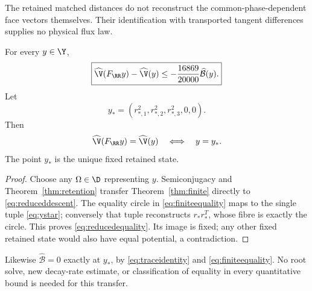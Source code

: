 The retained matched distances do not reconstruct the common-phase-dependent face vectors themselves. Their identification with transported tangent differences supplies no physical flux law.

\begin{corollary}\label{cor:retaineddescent}
For every \(y\in\Y\),
\begin{equation}
\boxed{\widehat{\V}(F_{\RR}y)-\widehat{\V}(y)
\le-\frac{16869}{20000}\widehat{\mathcal B}(y).}
\label{eq:reduceddescent}
\end{equation}
Let
\begin{equation}
y_*=(r_{*,1}^2,r_{*,2}^2,r_{*,3}^2,0,0).
\label{eq:ystar}
\end{equation}
Then
\begin{equation}
\widehat{\V}(F_{\RR}y)=\widehat{\V}(y)
\quad\Longleftrightarrow\quad y=y_*.
\label{eq:reducedequality}
\end{equation}
The point \(y_*\) is the unique fixed retained state.
\end{corollary}
\begin{proof}
Choose any \(\Omega\in\D\) representing \(y\). Semiconjugacy and Theorem~\ref{thm:retention} transfer Theorem~\ref{thm:finite} directly to \eqref{eq:reduceddescent}. The equality circle in \eqref{eq:finiteequality} maps to the single tuple \eqref{eq:ystar}; conversely that tuple reconstructs \(r_*r_*^T\), whose fibre is exactly the circle. This proves \eqref{eq:reducedequality}. Its image is fixed; any other fixed retained state would also have equal potential, a contradiction.
\end{proof}

Likewise \(\widehat{\mathcal B}=0\) exactly at \(y_*\), by \eqref{eq:traceidentity} and \eqref{eq:finiteequality}. No root solve, new decay-rate estimate, or classification of equality in every quantitative bound is needed for this transfer.
